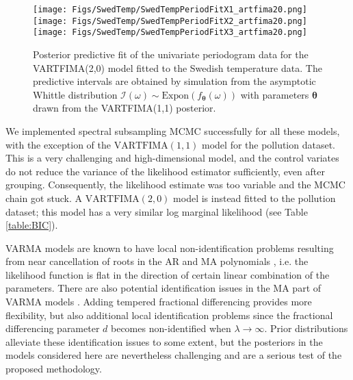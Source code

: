 \documentclass[11pt,english,oneside]{amsart}
\numberwithin{equation}{section}
\theoremstyle{plain}
\numberwithin{equation}{section}
\renewcommand{\v}[1]{\boldsymbol{#1}}
\begin{document}
\begin{figure}
    \texttt{[image: Figs/SwedTemp/SwedTempPeriodFitX1\_artfima20.png]}
    \texttt{[image: Figs/SwedTemp/SwedTempPeriodFitX2\_artfima20.png]}
    \texttt{[image: Figs/SwedTemp/SwedTempPeriodFitX3\_artfima20.png]}
    \caption{Posterior predictive fit of the univariate periodogram data for the VARTFIMA(2,0) model fitted to the Swedish temperature data. The predictive intervals are obtained by simulation from the asymptotic Whittle distribution $\mathcal{I}(\omega)\sim\mathrm{Expon}(f_{\v\theta}(\omega))$ with parameters $\v\theta$ drawn from the VARTFIMA(1,1) posterior.}\label{fig:SwedTempSpectral}
\end{figure}

We implemented spectral subsampling MCMC successfully for all these models, with the exception of the $\mathrm{VARTFIMA}(1,1)$ model for the pollution dataset. This is a very challenging and high-dimensional model, and the control variates do not reduce the variance of the likelihood estimator sufficiently, even after grouping. Consequently, the likelihood estimate was too variable and the MCMC chain got stuck. A $\mathrm{VARTFIMA}(2,0)$ model is instead fitted to the pollution dataset; this model has a very similar log marginal likelihood (see Table \ref{table:BIC}). 

VARMA models are known to have local non-identification problems resulting from near cancellation of roots in the AR and MA polynomials \citep{chib1994bayes}, i.e. the likelihood function is flat in the direction of certain linear combination of the parameters. There are also potential identification issues in the MA part of VARMA models \citep[Ch. 7]{lutkepohl2013introduction}. Adding tempered fractional differencing provides more flexibility, but also additional local identification problems since the fractional differencing parameter $d$ becomes non-identified when $\lambda \rightarrow \infty$. Prior distributions alleviate these identification issues to some extent, but the posteriors in the models considered here are nevertheless challenging and are a serious test of the proposed methodology.
\end{document}
